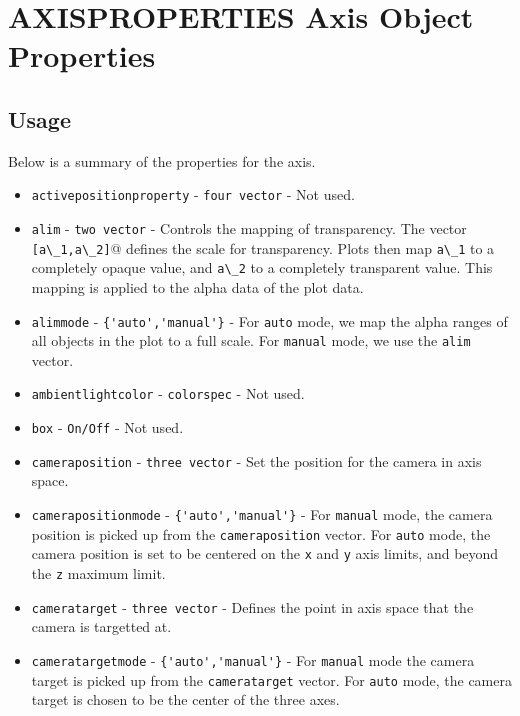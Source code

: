 \section{AXISPROPERTIES Axis Object Properties}

\subsection{Usage}

Below is a summary of the properties for the axis. 
\begin{itemize}
\item  \verb|activepositionproperty| - \verb|four vector| - Not used.

\item  \verb|alim| - \verb|two vector| - Controls the mapping of 
 transparency.  The vector \verb|[a\_1,a\_2]|@ defines the scale for transparency.
 Plots then map \verb|a\_1| to a completely opaque value, and \verb|a\_2| to a 
 completely transparent value.  This mapping is applied to the alpha
 data of the plot data.

\item  \verb|alimmode| - \verb|{'auto','manual'}| - For \verb|auto| mode, we 
 map the alpha ranges of all objects in the plot to a full scale.
 For \verb|manual| mode, we use the \verb|alim| vector.

\item  \verb|ambientlightcolor| - \verb|colorspec| - Not used.

\item  \verb|box| - \verb|On/Off| - Not used.

\item  \verb|cameraposition| - \verb|three vector| - Set the position for the
 camera in axis space.

\item  \verb|camerapositionmode| - \verb|{'auto','manual'}| - For \verb|manual|
 mode, the camera position is picked up from the \verb|cameraposition| vector.
 For \verb|auto| mode, the camera position is set to be centered on the 
 \verb|x| and \verb|y| axis limits, and beyond the \verb|z| maximum limit.

\item  \verb|cameratarget| - \verb|three vector| - Defines the point in axis
 space that the camera is targetted at.

\item  \verb|cameratargetmode| - \verb|{'auto','manual'}| - For \verb|manual|
 mode the camera target is picked up from the \verb|cameratarget| vector.  For
 \verb|auto| mode, the camera target is chosen to be the center of the 
 three axes.


\end{itemize}
